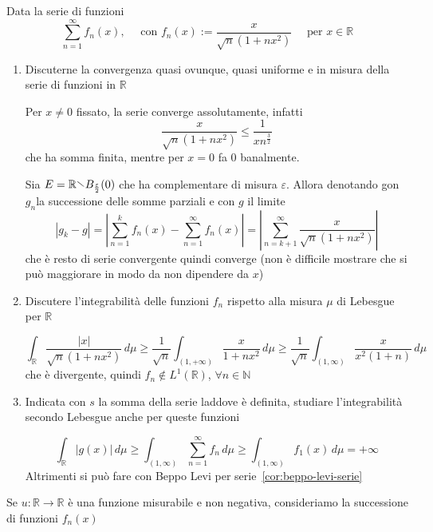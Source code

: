 \begin{eser}[Es. 1 del 10 \-- 07 \-- 2018]
    Data la serie di funzioni
    \[
      \sum_{n=1}^{\infty} f_{n}{(x)}, \quad \text{ con } f_{n}{(x)} :=
      \frac{x}{\sqrt{n}{(1+nx^2)}} \quad \text{ per } x \in \mathbb{R}
    \]
\begin{enumerate}[label = \alph*.]
    \item Discuterne la convergenza quasi ovunque, quasi uniforme e in misura
        della serie di funzioni in \(\mathbb{R}\) 

    Per \(x\neq 0\) fissato, la serie converge assolutamente, infatti
    \[
      \frac{x}{\sqrt{n}{(1 + nx^2)}} \le \frac{1}{xn^{\frac{3}{2}}} 
    \]
    che ha somma finita, mentre per \(x=0\) fa 0 banalmente.

    Sia \(E = \mathbb{R} \sminus B_{\frac{\varepsilon}{2}} {(0)}\) che ha
    complementare di misura \(\varepsilon\). Allora denotando gon \(g_{n}\)la
    successione delle somme parziali e con \(g\) il limite 
    \[
        \left| g_{k} - g \right| = \left| \sum_{n=1}^{k} f_{n}{(x)} -
        \sum_{n=1}^{\infty} f_{n}{(x)}   \right| = \left| \sum_{n=k+1}^{\infty}
        \frac{x}{\sqrt{n}{(1+nx^2)}}\right| 
    \]
    che è resto di serie convergente quindi converge (non è difficile mostrare
    che si può maggiorare in modo da non dipendere da \(x\))
    \item Discutere l'integrabilità delle funzioni \(f_{n}\) rispetto alla
        misura \(\mu\) di Lebesgue per \(\mathbb{R}\) 

    \[
      \int _{\mathbb{R}} \frac{|x|}{\sqrt{n}{(1+nx^2)}} \,d \mu \ge
      \frac{1}{\sqrt{n}} \int _{(1, +\infty)} \frac{x}{1+nx^2}  \,d \mu \ge
      \frac{1}{\sqrt{n}} \int _{{(1, \infty)}} \frac{x}{x^2{(1+n)}} \,d \mu
    \]
    che è divergente, quindi \(f_{n}\not\in L^{1}{(\mathbb{R})}\), \(\forall n
    \in \mathbb{N}\) 
    \item Indicata con \(s\) la somma della serie laddove è definita, studiare
        l'integrabilità secondo Lebesgue anche per queste funzioni

    \[
        \int _{\mathbb{R}} |g{(x)}| \,d \mu \ge \int _{{(1, \infty)}}
        \sum_{n=1}^{\infty} f_{n} \,d \mu \ge \int _{{(1, \infty)}} f_{1}{(x)}
        \,d \mu = +\infty
    \]
    Altrimenti si può fare con Beppo Levi per serie~\ref{cor:beppo-levi-serie}
\end{enumerate}
\end{eser}

\begin{eser}[Es. 1 del 17 \-- 01 \-- 2018]
    Se \(u : \mathbb{R} \to \mathbb{R}\) è una funzione misurabile e non
    negativa, consideriamo la successione di funzioni \(f_{n}{(x)}\) 
\end{eser}


